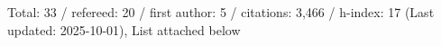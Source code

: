 Total: 33 / refereed: 20 / first author: 5 / citations: 3,466 / h-index: 17 (Last updated: 2025-10-01), List attached below